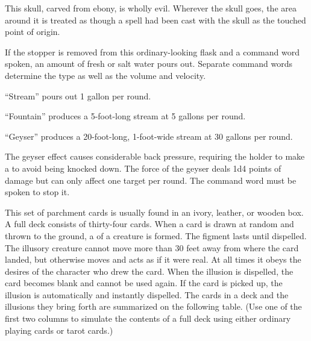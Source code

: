 {\begin{comment}
If a side is pressed twice in quick succession, the character so doing is transported to a random point on the other plane, along with all creatures in adjacent squares. (The other creatures may avoid this fate by succeeding on DC 23 Will saves).

Strong conjuration; CL 13th; Craft Wondrous Item, plane shift; Price 164,000 gp.
\end{comment}

 This skull, carved from ebony, is wholly evil. Wherever the skull goes, the area around it is treated as though a  spell had been cast with the skull as the touched point of origin.


 If the stopper is removed from this ordinary-looking flask and a command word spoken, an amount of fresh or salt water pours out. Separate command words determine the type as well as the volume and velocity.
\begin{itemize*}
\item ``Stream'' pours out 1 gallon per round.
\item ``Fountain'' produces a 5-foot-long stream at 5 gallons per round.
\item ``Geyser'' produces a 20-foot-long, 1-foot-wide stream at 30 gallons per round.
\end{itemize*}

The geyser effect causes considerable back pressure, requiring the holder to make a  to avoid being knocked down. The force of the geyser deals 1d4 points of damage but can only affect one target per round. The command word must be spoken to stop it.


 This set of parchment cards is usually found in an ivory, leather, or wooden box. A full deck consists of thirty-four cards. When a card is drawn at random and thrown to the ground, a  of a creature is formed. The figment lasts until dispelled. The illusory creature cannot move more than 30 feet away from where the card landed, but otherwise moves and acts as if it were real. At all times it obeys the desires of the character who drew the card. When the illusion is dispelled, the card becomes blank and cannot be used again. If the card is picked up, the illusion is automatically and instantly dispelled. The cards in a deck and the illusions they bring forth are summarized on the following table. (Use one of the first two columns to simulate the contents of a full deck using either ordinary playing cards or tarot cards.)

}
